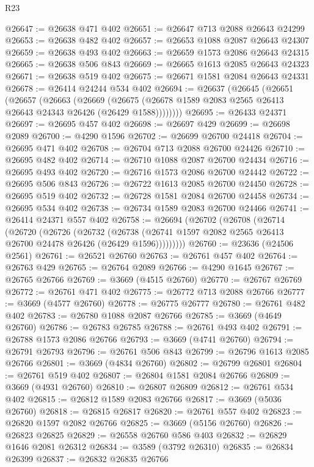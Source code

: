 \begin{lexlean}{R23}
\begin{coremodule}
@26647 := @26638 @471 @402
@26651 := @26647 @713 @2088 @26643 @24299
@26653 := @26638 @482 @402
@26657 := @26653 @1088 @2087 @26643 @24307
@26659 := @26638 @493 @402
@26663 := @26659 @1573 @2086 @26643 @24315
@26665 := @26638 @506 @843
@26669 := @26665 @1613 @2085 @26643 @24323
@26671 := @26638 @519 @402
@26675 := @26671 @1581 @2084 @26643 @24331
@26678 := @26414 @24244 @534 @402
@26694 := @26637
    (@26645
      (@26651
        (@26657
          (@26663
            (@26669
              (@26675 (@26678 @1589 @2083 @2565 @26413 @26643 @24343 @26426 (@26429 @1588))))))))
@26695 := @26433 @24371
@26697 := @26695 @457 @402
@26698 := @26697 @429
@26699 := @26698 @2089
@26700 := @4290 @1596
@26702 := @26699 @26700 @24418
@26704 := @26695 @471 @402
@26708 := @26704 @713 @2088 @26700 @24426
@26710 := @26695 @482 @402
@26714 := @26710 @1088 @2087 @26700 @24434
@26716 := @26695 @493 @402
@26720 := @26716 @1573 @2086 @26700 @24442
@26722 := @26695 @506 @843
@26726 := @26722 @1613 @2085 @26700 @24450
@26728 := @26695 @519 @402
@26732 := @26728 @1581 @2084 @26700 @24458
@26734 := @26695 @534 @402
@26738 := @26734 @1589 @2083 @26700 @24466
@26741 := @26414 @24371 @557 @402
@26758 := @26694
    (@26702
      (@26708
        (@26714
          (@26720
            (@26726
              (@26732
                (@26738 (@26741 @1597 @2082 @2565 @26413 @26700 @24478 @26426 (@26429 @1596)))))))))
@26760 := @23636 (@24506 @2561)
@26761 := @26521 @26760
@26763 := @26761 @457 @402
@26764 := @26763 @429
@26765 := @26764 @2089
@26766 := @4290 @1645
@26767 := @26765 @26766
@26769 := @3669 (@4515 @26760)
@26770 := @26767 @26769
@26772 := @26761 @471 @402
@26775 := @26772 @713 @2088 @26766
@26777 := @3669 (@4577 @26760)
@26778 := @26775 @26777
@26780 := @26761 @482 @402
@26783 := @26780 @1088 @2087 @26766
@26785 := @3669 (@4649 @26760)
@26786 := @26783 @26785
@26788 := @26761 @493 @402
@26791 := @26788 @1573 @2086 @26766
@26793 := @3669 (@4741 @26760)
@26794 := @26791 @26793
@26796 := @26761 @506 @843
@26799 := @26796 @1613 @2085 @26766
@26801 := @3669 (@4834 @26760)
@26802 := @26799 @26801
@26804 := @26761 @519 @402
@26807 := @26804 @1581 @2084 @26766
@26809 := @3669 (@4931 @26760)
@26810 := @26807 @26809
@26812 := @26761 @534 @402
@26815 := @26812 @1589 @2083 @26766
@26817 := @3669 (@5036 @26760)
@26818 := @26815 @26817
@26820 := @26761 @557 @402
@26823 := @26820 @1597 @2082 @26766
@26825 := @3669 (@5156 @26760)
@26826 := @26823 @26825
@26829 := @26558 @26760 @586 @403
@26832 := @26829 @1646 @2081 @26312
@26834 := @3589 (@3792 @26310)
@26835 := @26834 @26399
@26837 := @26832 @26835 @26766

\end{coremodule}
\end{lexlean}
